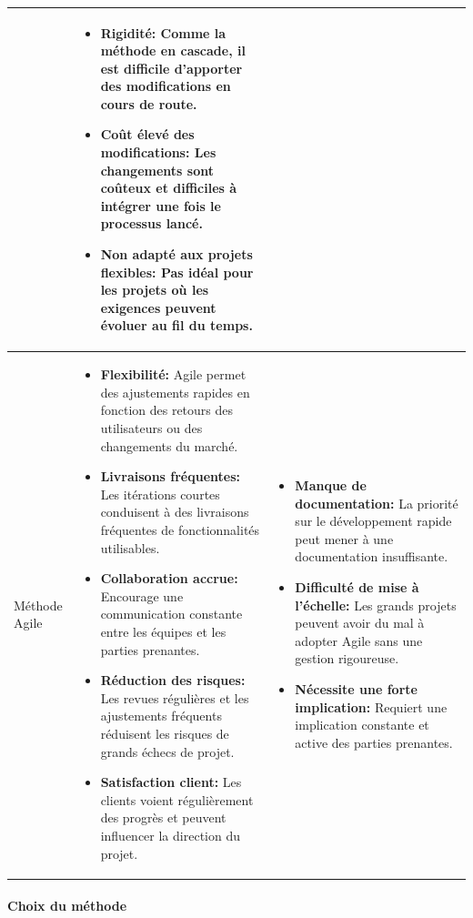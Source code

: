 \documentclass[12pt]{report}
\begin{document}
\begin{longtable}{|p{3cm}|p{5.5cm}|p{5.5cm}|}
\begin{itemize}
						\end{itemize} &
						\begin{itemize}
							\item \textbf{Rigidité:} Comme la méthode en cascade, il est difficile d'apporter des modifications en cours de route.
							\item \textbf{Coût élevé des modifications:} Les changements sont coûteux et difficiles à intégrer une fois le processus lancé.
							\item \textbf{Non adapté aux projets flexibles:} Pas idéal pour les projets où les exigences peuvent évoluer au fil du temps.
						\end{itemize}\\
						\hline 
						Méthode Agile &
						\begin{itemize}
							\item \textbf{Flexibilité:} Agile permet des ajustements rapides en fonction des retours des utilisateurs ou des changements du marché.
							\item \textbf{Livraisons fréquentes:} Les itérations courtes conduisent à des livraisons fréquentes de fonctionnalités utilisables.
							\item \textbf{Collaboration accrue:} Encourage une communication constante entre les équipes et les parties prenantes.
							\item \textbf{Réduction des risques:} Les revues régulières et les ajustements fréquents réduisent les risques de grands échecs de projet.
							\item \textbf{Satisfaction client:} Les clients voient régulièrement des progrès et peuvent influencer la direction du projet.
						\end{itemize} &
						\begin{itemize}
							\item \textbf{Manque de documentation:} La priorité sur le développement rapide peut mener à une documentation insuffisante.
							\item \textbf{Difficulté de mise à l'échelle:} Les grands projets peuvent avoir du mal à adopter Agile sans une gestion rigoureuse.
							\item \textbf{Nécessite une forte implication:} Requiert une implication constante et active des parties prenantes.
						\end{itemize}\\
						\hline 
				    \end{longtable}

				\paragraph{Choix du méthode}
\end{document}
